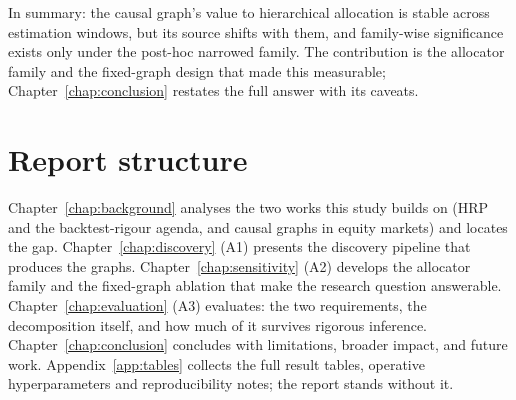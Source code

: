 In summary: the causal graph's value to hierarchical allocation
is stable across estimation windows, but its source shifts with them,
and family-wise significance exists only under the post-hoc narrowed
family. The contribution is the allocator family
and the fixed-graph design that made this measurable;
Chapter~\ref{chap:conclusion} restates the full answer with its caveats.

\section{Report structure}
\label{sec:structure}

Chapter~\ref{chap:background} analyses the two works this study builds
on (HRP and the backtest-rigour agenda, and causal graphs in equity
markets) and locates the gap. Chapter~\ref{chap:discovery} (A1) presents the
discovery pipeline that produces the graphs. Chapter~\ref{chap:sensitivity}
(A2) develops the allocator family and the fixed-graph ablation that make the
research question
answerable. Chapter~\ref{chap:evaluation} (A3) evaluates: the two
requirements, the decomposition itself, and how much of it survives rigorous
inference. Chapter~\ref{chap:conclusion} concludes with limitations,
broader impact, and future work. Appendix~\ref{app:tables} collects the full
result tables,
operative hyperparameters and reproducibility notes; the report stands
without it.
